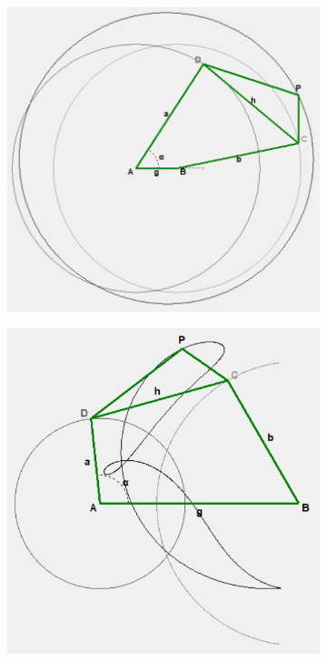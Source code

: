 \documentclass{article}
\begin{document}
\begin{figure}[h]
\begin{subfigure}{0.19\textwidth}
		\caption{}
	\end{subfigure}
	\hfill
	\begin{subfigure}{0.19\textwidth}
		\centering
		\includegraphics[width=\linewidth, height=0.95\linewidth, keepaspectratio]{./Figures/27_motion_cases/-1-11.png}
		\caption{}
	\end{subfigure}
	\hfill
	\begin{subfigure}{0.19\textwidth}
		\centering
		\includegraphics[width=\linewidth, height=0.95\linewidth, keepaspectratio]{./Figures/27_motion_cases/110.png}

\end{subfigure}
\end{figure}
\end{document}

